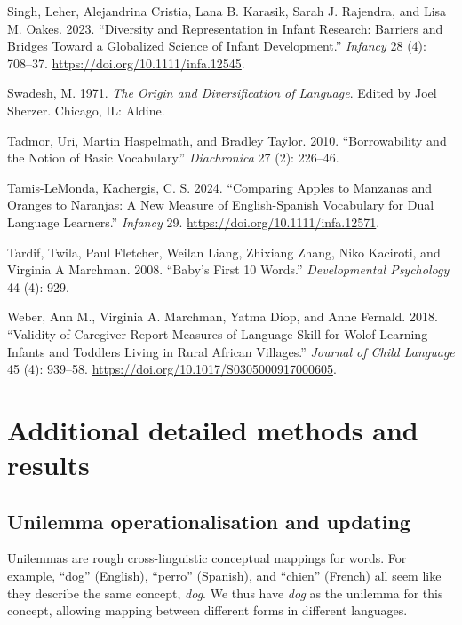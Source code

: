 \documentclass[
  letterpaper,
  DIV=11,
  numbers=noendperiod]{scrartcl}
\newlength{\cslhangindent}
\newenvironment{CSLReferences}[2] %
 {\begin{list}{}{%
  \setlength{\itemindent}{0pt}
  \setlength{\leftmargin}{0pt}
  \setlength{\parsep}{0pt}
  \ifodd #1
   \setlength{\leftmargin}{\cslhangindent}
   \setlength{\itemindent}{-1\cslhangindent}
  \fi
  \setlength{\itemsep}{#2\baselineskip}}}
 {\end{list}}
\begin{document}
\begin{CSLReferences}{1}{0}
Singh, Leher, Alejandrina Cristia, Lana B. Karasik, Sarah J. Rajendra,
and Lisa M. Oakes. 2023. {``Diversity and Representation in Infant
Research: {Barriers} and Bridges Toward a Globalized Science of Infant
Development.''} \emph{Infancy} 28 (4): 708--37.
\url{https://doi.org/10.1111/infa.12545}.

Swadesh, M. 1971. \emph{The Origin and Diversification of Language}.
Edited by Joel Sherzer. Chicago, IL: Aldine.

Tadmor, Uri, Martin Haspelmath, and Bradley Taylor. 2010.
{``Borrowability and the Notion of Basic Vocabulary.''}
\emph{Diachronica} 27 (2): 226--46.

Tamis-LeMonda, Kachergis, C. S. 2024. {``Comparing Apples to Manzanas
and Oranges to Naranjas: A New Measure of English-Spanish Vocabulary for
Dual Language Learners.''} \emph{Infancy} 29.
\url{https://doi.org/10.1111/infa.12571}.

Tardif, Twila, Paul Fletcher, Weilan Liang, Zhixiang Zhang, Niko
Kaciroti, and Virginia A Marchman. 2008. {``Baby's First 10 Words.''}
\emph{Developmental Psychology} 44 (4): 929.

Weber, Ann M., Virginia A. Marchman, Yatma Diop, and Anne Fernald. 2018.
{``Validity of Caregiver-Report Measures of Language Skill for
{Wolof}-Learning Infants and Toddlers Living in Rural African
Villages.''} \emph{Journal of Child Language} 45 (4): 939--58.
\url{https://doi.org/10.1017/S0305000917000605}.

\end{CSLReferences}

\section{Additional detailed methods and
results}\label{additional-detailed-methods-and-results}

\subsection{Unilemma operationalisation and
updating}\label{unilemma-operationalisation-and-updating}

Unilemmas are rough cross-linguistic conceptual mappings for words. For
example, ``dog'' (English), ``perro'' (Spanish), and ``chien'' (French)
all seem like they describe the same concept, \emph{dog}. We thus have
\emph{dog} as the unilemma for this concept, allowing mapping between
different forms in different languages.
\end{document}
